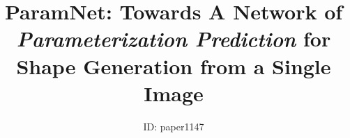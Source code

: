 

\title[ParamNet: Towards A Network of \emph{Parameterization
	Prediction} for Shape Generation from a Single Image]%
      {ParamNet: Towards A Network of \emph{Parameterization
      	Prediction} for Shape Generation from a Single Image}

\author[ID: paper1147]
{ID: paper1147}

%





\maketitle
 





%




